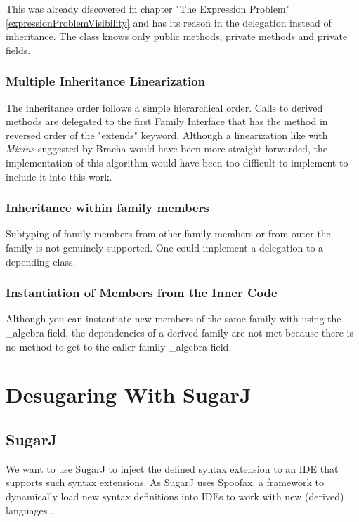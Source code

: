 \documentclass{report}
\begin{document}
This was already discovered in chapter "The Expression Problem" \ref{expressionProblemVisibility} and has its reason in the delegation instead of inheritance.
The class knows only public methods, private methods and private fields.

\subsection{Multiple Inheritance Linearization}

The inheritance order follows a simple hierarchical order. Calls to derived methods are delegated to the first Family Interface that has the method in reversed order of the "extends" keyword. Although a linearization like with \emph{Mixins} suggested by Bracha \cite{Bracha-Mixin-1990} would have been more straight-forwarded, the implementation of this algorithm would have been too difficult to implement to include it into this work.


\subsection{Inheritance within family members}

Subtyping of family members from other family members or from outer the family is not genuinely supported. One could implement a delegation to a depending class.

\subsection{Instantiation of Members from the Inner Code}

Although you can instantiate new members of the same family with using the \_algebra field, the dependencies of a derived family are not met because there is no method to get to the caller family \_algebra-field.

\chapter{Desugaring With SugarJ}
\label{sugarJChapter}

\section{SugarJ}
We want to use SugarJ \cite{Erdweg-SugarJ-2011} to inject the defined syntax extension to an IDE that supports such syntax extensions. As SugarJ uses Spoofax, a framework to dynamically load new syntax definitions into IDEs to work with new (derived) languages \cite{Kats-Spoofax-2010}.
\end{document}
